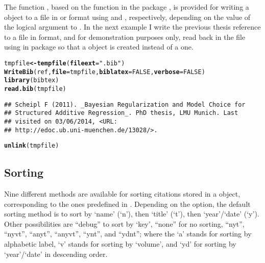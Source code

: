\documentclass[article]{jss}\usepackage[]{graphicx}\usepackage[]{color}
\makeatletter
\newcommand{\hlnum}[1]{\textcolor[rgb]{0.125,0.125,1}{#1}}%
\newcommand{\hlstr}[1]{\textcolor[rgb]{0.125,0.125,1}{#1}}%
\newcommand{\hlstd}[1]{\textcolor[rgb]{0.251,0.251,0.282}{#1}}%
\newcommand{\hlkwb}[1]{\textcolor[rgb]{0.439,0.251,1}{\textbf{#1}}}%
\newcommand{\hlkwc}[1]{\textcolor[rgb]{0.529,0,0.184}{\textbf{#1}}}%
\newcommand{\hlkwd}[1]{\textcolor[rgb]{0.251,0.251,0.282}{\textbf{#1}}}%
\newenvironment{kframe}{%
 \def\at@end@of@kframe{}%
 \ifinner\ifhmode%
  \def\at@end@of@kframe{\end{minipage}}%
  \begin{minipage}{\columnwidth}%
 \fi\fi%
 \def\FrameCommand##1{\hskip\@totalleftmargin \hskip-\fboxsep
 \colorbox{shadecolor}{##1}\hskip-\fboxsep
     \hskip-\linewidth \hskip-\@totalleftmargin \hskip\columnwidth}%
 \MakeFramed {\advance\hsize-\width
   \@totalleftmargin\z@ \linewidth\hsize
   \@setminipage}}%
 {\par\unskip\endMakeFramed%
 \at@end@of@kframe}
\newenvironment{knitrout}{}{} %
\makeatother
\begin{document}
The function , based on the function  in the package  \citep{Rbibtex}, is provided for writing a  object to a  file in \Biblatex{} or \Bibtex{} format using  and , respectively, depending on the value of the  logical argument to .  In the next example I write the previous thesis reference to a file in \Bibtex{} format, and for demonstration purposes only, read back in the  file using  in package  so that a  object is created instead of a  one.
\begin{knitrout}
\color{fgcolor}\begin{kframe}
\begin{alltt}
\hlstd{tmpfile} \hlkwb{<-} \hlkwd{tempfile}\hlstd{(}\hlkwc{fileext} \hlstd{=} \hlstr{".bib"}\hlstd{)}
\hlkwd{WriteBib}\hlstd{(ref,} \hlkwc{file} \hlstd{= tmpfile,} \hlkwc{biblatex} \hlstd{=} \hlnum{FALSE}\hlstd{,} \hlkwc{verbose} \hlstd{=} \hlnum{FALSE}\hlstd{)}
\hlkwd{library}\hlstd{(bibtex)}
\hlkwd{read.bib}\hlstd{(tmpfile)}
\end{alltt}
\begin{verbatim}
## Scheipl F (2011). _Bayesian Regularization and Model Choice for
## Structured Additive Regression_. PhD thesis, LMU Munich. Last
## visited on 03/06/2014, <URL:
## http://edoc.ub.uni-muenchen.de/13028/>.
\end{verbatim}
\begin{alltt}
\hlkwd{unlink}\hlstd{(tmpfile)}
\end{alltt}
\end{kframe}
\end{knitrout}

\subsection{Sorting}
Nine different methods are available for sorting citations stored in a  object, corresponding to the ones predefined in \Biblatex{}.  Depending on the  option, the default sorting method is  to sort by `name' (`n'), then `title' (`t'), then `year'/`date' (`y').  Other possibilities are ``debug'' to sort by `key', ``none'' for no sorting, ``nyt'', ``nyvt'', ``anyt'', ``anyvt'', ``ynt'', and ``ydnt''; where the `a' stands for sorting by alphabetic label, `v' stands for sorting by `volume', and `yd' for sorting by `year'/`date' in descending order.
\end{document}
